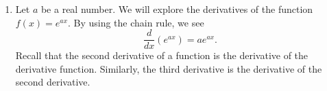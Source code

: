 \begin{enumerate}
%
%
%
%
%

\item  \label{exer:derivatives} 
Let  $a$  be a real number.  We will explore the derivatives of the function 
$f\left( x \right) = e^{ax} $.  By using the chain rule, we see
\[
\frac{d}
{{dx}}\left( {e^{ax} } \right) = ae^{ax}. 
\]
Recall that the second derivative of a function is the derivative of the derivative function.  Similarly, the third derivative is the derivative of the second derivative.


\end{enumerate}
